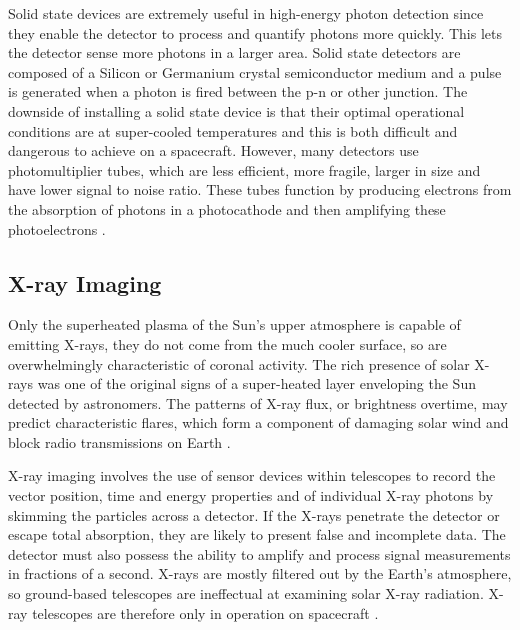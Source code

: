 \documentclass[12pt]{article}
\begin{document}
\vspace{\baselineskip}

Solid state devices are extremely useful in high-energy photon detection since they enable the detector to process and quantify photons more quickly. This lets the detector sense more photons in a larger area. Solid state detectors are composed of a Silicon or Germanium crystal semiconductor medium and a pulse is generated when a photon is fired between the p-n or other junction. The downside of installing a solid state device is that their optimal operational conditions are at super-cooled temperatures and this is both difficult and dangerous to achieve on a spacecraft. However, many detectors use photomultiplier tubes, which are less efficient, more fragile, larger in size and have lower signal to noise ratio. These tubes function by producing electrons from the absorption of photons in a photocathode and then amplifying these photoelectrons \cite{solidstate}.

\vspace{\baselineskip}
\subsection{X-ray Imaging}
\vspace{\baselineskip}

Only the superheated plasma of the Sun’s upper atmosphere is capable of emitting X-rays, they do not come from the much cooler surface, so are overwhelmingly characteristic of coronal activity. The rich presence of solar X-rays was one of the original signs of a super-heated layer enveloping the Sun detected by astronomers. The patterns of X-ray flux, or brightness overtime, may predict characteristic flares, which form a component of damaging solar wind and block radio transmissions on Earth \cite{xray1}.

\vspace{\baselineskip}

X-ray imaging involves the use of sensor devices within telescopes to record the vector position, time and energy properties and of individual X-ray photons by skimming the particles across a detector. If the X-rays penetrate the detector or escape total absorption, they are likely to present false and incomplete data. The detector must also possess the ability to amplify and process signal measurements in fractions of a second. X-rays are mostly filtered out by the Earth’s atmosphere, so ground-based telescopes are ineffectual at examining solar X-ray radiation. X-ray telescopes are therefore only in operation on spacecraft \cite{xray2}.
\end{document}
